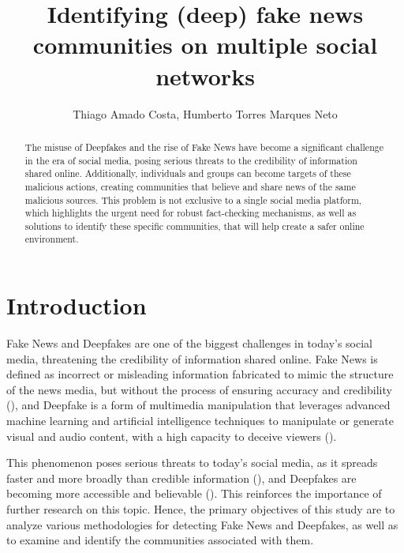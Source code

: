 \documentclass[12pt]{article}
\title{Identifying (deep) fake news communities on multiple social networks}
\author{Thiago Amado Costa\inst{1}, Humberto Torres Marques Neto\inst{1}}
\begin{document}
 

\maketitle

\begin{abstract}
  The misuse of Deepfakes and the rise of Fake News have become a significant challenge in the
  era of social media, posing serious threats to the credibility of information shared online.
  Additionally, individuals and groups can become targets of these malicious actions, creating
  communities that believe and share news of the same malicious sources.
  This problem is not exclusive to a single social media platform, which highlights the urgent
  need for robust fact-checking mechanisms, as well as solutions to identify these specific
  communities, that will help create a safer online environment.
\end{abstract}

\section{Introduction}

Fake News and Deepfakes are one of the biggest challenges in today's social media, threatening the
credibility of information shared online. 
Fake News is defined as incorrect or misleading information fabricated to mimic the structure of 
the news media, but without the process of ensuring accuracy and credibility (\cite{lazer2018science}),
and Deepfake is a form of multimedia manipulation that leverages advanced machine learning and artificial
intelligence techniques to manipulate or generate visual and audio content, with a high capacity to deceive
viewers (\cite{KIETZMANN2020135}). 

This phenomenon poses serious threats to today's social media, as it spreads faster and more broadly
than credible information (\cite{doi:10.1126/science.aap9559}), and Deepfakes are becoming more
accessible and believable (\cite{KIETZMANN2020135}). This reinforces the importance of further
research on this topic.
Hence, the primary objectives of this study are to analyze various methodologies for detecting 
Fake News and Deepfakes, as well as to examine and identify the communities associated with them.



\end{document}
